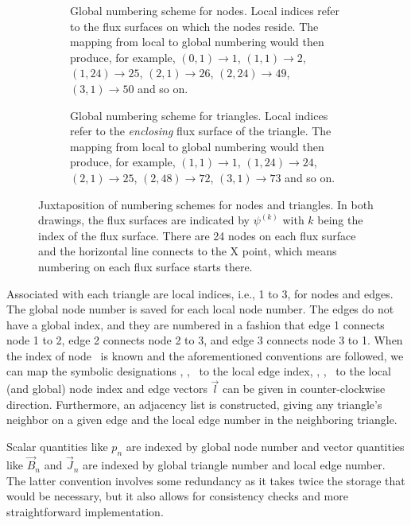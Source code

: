 \savebox{\imagebox}{}%
\begin{figure}[bth]
  \centering
  \begin{subfigure}[t]{0.48\textwidth}
    \centering
    \usebox{\imagebox}
    \caption{Global numbering scheme for nodes. Local indices refer to the flux surfaces on which the nodes reside. The mapping from local to global numbering would then produce, for example, $(0, 1) \to 1$, $(1, 1) \to 2$, $(1, 24) \to 25$, $(2, 1) \to 26$, $(2, 24) \to 49$, $(3, 1) \to 50$ and so on.}
    \label{fig:numbering_nodes}
  \end{subfigure}
  \quad
  \begin{subfigure}[t]{0.48\textwidth}
    \centering
    \raisebox{\dimexpr\ht\imagebox-\height}{}
    \caption{Global numbering scheme for triangles. Local indices refer to the \emph{enclosing} flux surface of the triangle. The mapping from local to global numbering would then produce, for example, $(1, 1) \to 1$, $(1, 24) \to 24$, $(2, 1) \to 25$, $(2, 48) \to 72$, $(3, 1) \to 73$ and so on.}
    \label{fig:numbering_triangles}
  \end{subfigure}
  \caption{Juxtaposition of numbering schemes for nodes and triangles. In both drawings, the flux surfaces are indicated by $\psi^{(k)}$ with $k$ being the index of the flux surface. There are 24 nodes on each flux surface and the horizontal line connects to the X point, which means numbering on each flux surface starts there.}
  \label{fig:numbering_scheme}
\end{figure}

Associated with each triangle are local indices, i.e., 1 to 3, for nodes and edges. The global node number is saved for each local node number. The edges do not have a global index, and they are numbered in a fashion that edge 1 connects node 1 to 2, edge 2 connects node 2 to 3, and edge 3 connects node 3 to 1. When the index of node \vfs\ is known and the aforementioned conventions are followed, we can map the symbolic designations \fs, \inw, \out\ to the local edge index, \vfs, \vinw, \vout\ to the local (and global) node index and edge vectors $\vec{l}$ can be given in counter-clockwise direction. Furthermore, an adjacency list is constructed, giving any triangle's neighbor on a given edge and the local edge number in the neighboring triangle.

Scalar quantities like $p_{n}$ are indexed by global node number and vector quantities like $\vec{B}_{n}$ and $\vec{J}_{n}$ are indexed by global triangle number and local edge number. The latter convention involves some redundancy as it takes twice the storage that would be necessary, but it also allows for consistency checks and more straightforward implementation.

